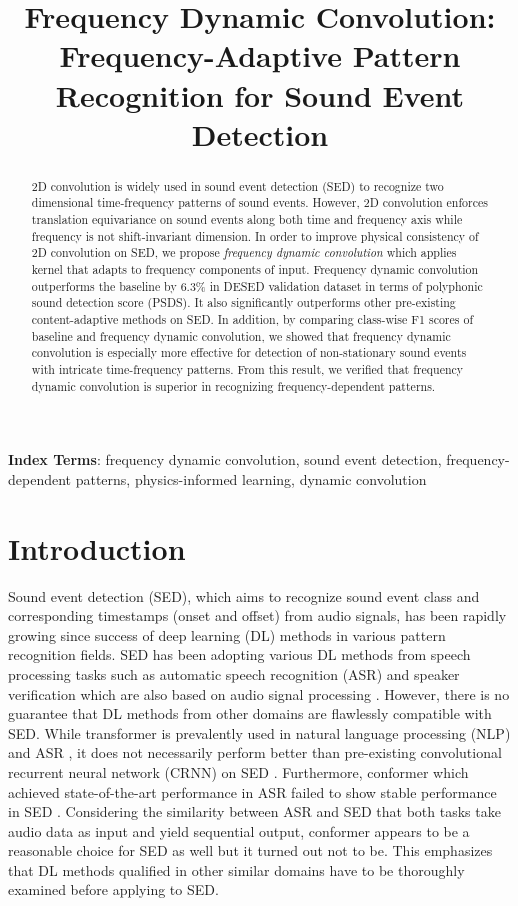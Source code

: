 \documentclass[a4paper]{article}
\title{Frequency Dynamic Convolution: Frequency-Adaptive Pattern Recognition for Sound Event Detection}
\begin{document}
\maketitle
\begin{abstract}
2D convolution is widely used in sound event detection (SED) to recognize two dimensional time-frequency patterns of sound events. However, 2D convolution enforces translation equivariance on sound events along both time and frequency axis while frequency is not shift-invariant dimension. In order to improve physical consistency of 2D convolution on SED, we propose \textit{frequency dynamic convolution} which applies kernel that adapts to frequency components of input. Frequency dynamic convolution outperforms the baseline by 6.3\% in DESED validation dataset in terms of polyphonic sound detection score (PSDS). It also significantly outperforms other pre-existing content-adaptive methods on SED. In addition, by comparing class-wise F1 scores of baseline and frequency dynamic convolution, we showed that frequency dynamic convolution is especially more effective for detection of non-stationary sound events with intricate time-frequency patterns. From this result, we verified that frequency dynamic convolution is superior in recognizing frequency-dependent patterns. \end{abstract}
\noindent\textbf{Index Terms}: frequency dynamic convolution, sound event detection, frequency-dependent patterns, physics-informed learning, dynamic convolution

\vspace{5pt}
\section{Introduction}
\vspace{5pt}
Sound event detection (SED), which aims to recognize sound event class and corresponding timestamps (onset and offset) from audio signals, has been rapidly growing since success of deep learning (DL) methods in various pattern recognition fields\cite{CASSE, sedmetrics, DCASEtask4, mytechreport, dcasewebsite}. SED has been adopting various DL methods from speech processing tasks such as automatic speech recognition (ASR) and speaker verification which are also based on audio signal processing \cite{specaug, conformer, coughcam, acnn}. However, there is no guarantee that DL methods from other domains are flawlessly compatible with SED. While transformer is prevalently used in natural language processing (NLP) and ASR \cite{transformer, bert}, it does not necessarily perform better than pre-existing convolutional recurrent neural network (CRNN) on SED \cite{dcase7wang,dcase22koo,dcase18hang}. Furthermore, conformer \cite{conformer} which achieved state-of-the-art performance in ASR failed to show stable performance in SED \cite{dcase21na, dcase3}. Considering the similarity between ASR and SED that both tasks take audio data as input and yield sequential output, conformer appears to be a reasonable choice for SED as well but it turned out not to be. This emphasizes that DL methods qualified in other similar domains have to be thoroughly examined before applying to SED.
\end{document}
